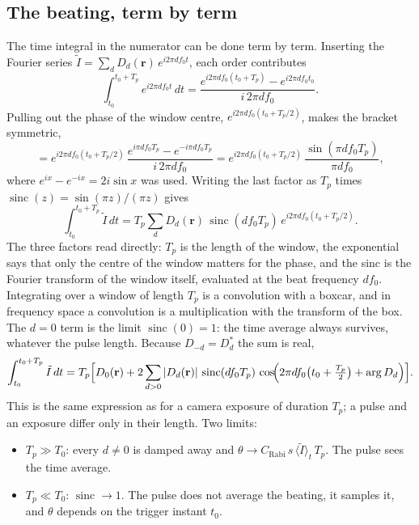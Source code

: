 \subsection*{The beating, term by term}
The time integral in the numerator can be done term by term. Inserting the Fourier series
$\tilde I=\sum_d D_d(\mathbf r)\,e^{i2\pi d f_0 t}$, each order contributes
\begin{equation}
\int_{t_0}^{t_0+T_p}e^{i2\pi d f_0 t}\,dt
=\frac{e^{i2\pi d f_0(t_0+T_p)}-e^{i2\pi d f_0 t_0}}{i\,2\pi d f_0}.
\end{equation}
Pulling out the phase of the window centre, $e^{i2\pi d f_0(t_0+T_p/2)}$, makes the bracket symmetric,
\begin{equation}
=e^{i2\pi d f_0(t_0+T_p/2)}\,\frac{e^{i\pi d f_0T_p}-e^{-i\pi d f_0T_p}}{i\,2\pi d f_0}
=e^{i2\pi d f_0(t_0+T_p/2)}\,\frac{\sin(\pi d f_0T_p)}{\pi d f_0},
\end{equation}
where $e^{ix}-e^{-ix}=2i\sin x$ was used. Writing the last factor as $T_p$ times
$\operatorname{sinc}(z)=\sin(\pi z)/(\pi z)$ gives
\begin{equation}
\int_{t_0}^{t_0+T_p}\tilde I\,dt
=T_p\sum_d D_d(\mathbf r)\,\operatorname{sinc}(d f_0T_p)\,e^{i2\pi d f_0(t_0+T_p/2)}.
\label{eq:boxcar}
\end{equation}
The three factors read directly: $T_p$ is the length of the window, the exponential says that only
the centre of the window matters for the phase, and the sinc is the Fourier transform of the window
itself, evaluated at the beat frequency $d f_0$. Integrating over a window of length $T_p$ is a
convolution with a boxcar, and in frequency space a convolution is a multiplication with the
transform of the box. The $d=0$ term is the limit $\operatorname{sinc}(0)=1$: the time average always
survives, whatever the pulse length. Because $D_{-d}=D_d^*$ the sum is real,
\begin{equation}
\int_{t_0}^{t_0+T_p}\tilde I\,dt
=T_p\Bigl[D_0(\mathbf r)+2\sum_{d>0}|D_d(\mathbf r)|\,\operatorname{sinc}(d f_0T_p)\,
\cos\!\Bigl(2\pi d f_0\bigl(t_0+\tfrac{T_p}{2}\bigr)+\arg D_d\Bigr)\Bigr].
\end{equation}
This is the same expression as for a camera exposure of duration $T_p$; a pulse and an exposure
differ only in their length. Two limits:
\begin{itemize}
\item $T_p\gg T_0$: every $d\neq0$ is damped away and $\theta\to C_\text{Rabi}\,s\,\langle\tilde I\rangle_t\,T_p$.
The pulse sees the time average.
\item $T_p\ll T_0$: $\operatorname{sinc}\to1$. The pulse does not average the beating, it samples it, and
$\theta$ depends on the trigger instant $t_0$.
\end{itemize}
